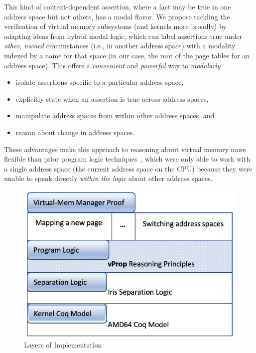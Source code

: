 This kind of context-dependent assertion, where a fact may be true in one address space but not others, has a modal flavor. 
We propose tackling the verification of virtual memory subsystems (and kernels more broadly) by adapting ideas from hybrid
modal logic, which can label assertions true under \emph{other, named} circumstances (i.e., in another address space) with a 
modality indexed by a name for that space (in our case, the root of the page tables for an address space). This offers a 
\textit{convenient} and \textit{powerful} way to \emph{modularly}
\begin{itemize}
\item isolate assertions specific to a particular address space,
\item explicitly state when an assertion is true across address spaces,
\item manipulate address spaces from within other address spaces, and
\item reason about change in address spaces.
\end{itemize}
These advantages make this approach to reasoning about virtual memory more flexible than prior program logic techniques~\cite{kolanski08vstte,kolanski09tphols}, 
which were only able to work with a single address space (the current address space on the CPU) because they were unable
to speak directly \emph{within the logic} about other address spaces.

\begin{figure}
   \includegraphics[width=0.5\columnwidth]{architecture.png}
  \caption{Layers of Implementation}
  \label{fig:architecture}
\end{figure}

